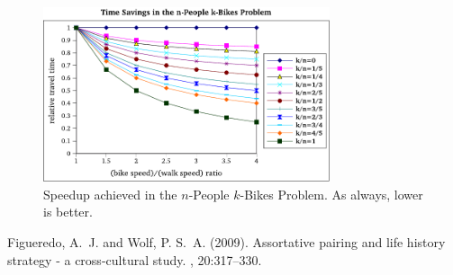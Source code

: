 \documentclass[DIV=calc, paper=a4, fontsize=11pt, twocolumn]{scrartcl}	 %
\newcommand\prob{$n$-People $k$-Bikes Problem}
\begin{document}
\begin{figure}[t]
	\centering
	\includegraphics[width=0.75\textwidth]{graph.pdf}
	\caption{Speedup achieved in the \prob. As always, lower is better.}
	\label{fig:graph}
\end{figure}

\begin{thebibliography}{99} %

Figueredo, A.~J. and Wolf, P. S.~A. (2009).
\newblock Assortative pairing and life history strategy - a cross-cultural
  study.
, 20:317--330.
 
\end{thebibliography}

\end{document}
